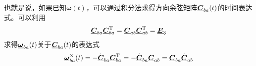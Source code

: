 

也就是说，如果已知$\bm{\omega}(t)$，可以通过积分法求得方向余弦矩阵$\underline{\bm{C}}_{ba}(t)$的时间表达式。可以利用
\begin{equation*} 
	\underline{\bm{C}}_{ba} \underline{\bm{C}}_{ba}^{\text{T}} = \underline{\bm{C}}_{ab} \underline{\bm{C}}_{ab}^{\text{T}} = \underline{\bm{E}}_3
\end{equation*}
求得$\underline{\bm{\omega}}_{ba}(t)$关于$\underline{\bm{C}}_{ba}(t)$的表达式
\begin{equation}
	\underline{\bm{\omega}}_{ba}^\times (t) = - \dot{\underline{\bm{C}}}_{ba} \underline{\bm{C}}_{ba}^{\text{T}} = - \dot{\underline{\bm{C}}}_{ba} \underline{\bm{C}}_{ab} = \underline{\bm{C}}_{ba} \dot{\underline{\bm{C}}}_{ab}
\end{equation}
\vspace*{0.5em}


\sssection[相继运动的角速度关系]

